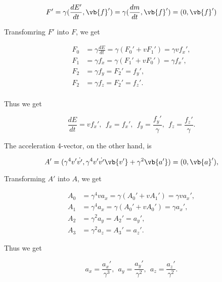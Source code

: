\documentclass[english,a4paper,12pt]{report}
\begin{document}
\begin{equation}
    F' = \gamma (\frac{dE'}{dt}, \vb{f} ' ) = \gamma ( \frac{dm}{dt}, \vb{f} ' ) = (0, \vb{f} ')
\end{equation}

Transfomring \(F'\) into \(F\), we get

\begin{equation}
    \begin{aligned}
        F_0 &= \gamma \frac{dE}{dt} = \gamma (F_0 ' + v F_1 ') = \gamma v f_{x}' , \\
        F_1 &= \gamma f_{x} =  \gamma (F_1 ' + v F_0 ') = \gamma f_{x}', \\
        F_2 &= \gamma f_{y} = F_2 ' =  f_{y}' , \\
        F_2 &= \gamma f_{z} = F_2 ' =  f_{z}' . \\
    \end{aligned}
\end{equation}

Thus we get 

\begin{equation}
        \frac{dE}{dt} = vf_{x}',  ~~
        f_{x} = f_{x}', ~~
        f_{y} = \frac{f_{y}' }{\gamma }, ~~
        f_{z} = \frac{f_{z}' }{\gamma }.   
\end{equation}

The acceleration 4-vector, on the other hand, is 

\begin{equation}
    A' = (\gamma ^{4}v' \dot{v'} , \gamma ^{4} v' \dot{v'} \vb{v'} + \gamma ^2 \vb{a'}) = (0,\vb{a} '),
\end{equation}

Transforming \(A'\) into \(A\), we get 

\begin{equation}
    \begin{aligned}
        A_0 &= \gamma ^{4}va_{x} = \gamma (A_0 ' + vA_1 ') = \gamma v a_{x}', \\
        A_1 &= \gamma ^{4} a_{x} = \gamma (A_0 ' + vA_0 ' ) = \gamma a_{x}', \\
        A_2 &= \gamma ^2 a_{y} = A_2 ' = a_{y}', \\
        A_3 &= \gamma ^2 a_{z} = A_3 ' = a_{z}'.           
    \end{aligned}
\end{equation}

Thus we get

\begin{equation}
    a_{x} = \frac{a_{x}' }{\gamma ^3 }, ~~ a_{y} = \frac{a_{y}' }{\gamma ^2}, ~~ a_{z} = \frac{a_{z}' }{\gamma ^2}.      
\end{equation}
\end{document}
